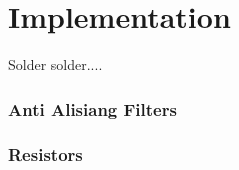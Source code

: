 \section{Implementation}
Solder solder....

\subsubsection*{Anti Alisiang Filters}

\subsubsection*{Resistors}

